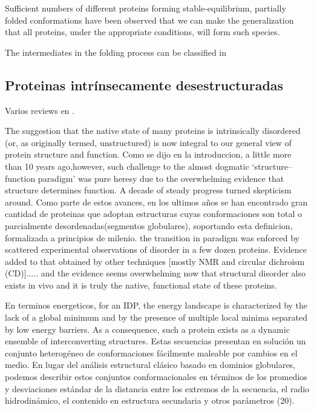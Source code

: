 Sufficient numbers of different proteins forming stable-equilibrium, partially folded conformations have been observed that we can
make the generalization that all proteins, under the appropriate conditions, will form such species.


The intermediates in the folding process can be classified in





\subsection{Proteinas intrínsecamente desestructuradas}

Varios reviews en \cite{uversky2010understanding,dyson2005intrinsically}.

The suggestion that the native state of many proteins is intrinsically disordered (or, as originally termed, unstructured) is now integral to our general view of protein structure and function.
Como se dijo en la introduccion, a little more than 10 years ago,however, such challenge to the almost dogmatic ‘structure–function paradigm’ was pure heresy due to the overwhelming evidence that structure determines function.
A decade of steady progress turned skepticism around.
Como parte de estos avances, en los ultimos años se han encontrado gran cantidad de proteinas que adoptan estructuras cuyas conformaciones son total o parcialmente desordenadas(segmentos globulares), soportando esta definicion, formalizada a principios de milenio. 
the transition in paradigm was enforced by scattered experimental observations of disorder in a few dozen proteins. 
Evidence added to that obtained by other techniques [mostly NMR and circular dichroism (CD)]..... and the evidence seems overwhelming now that structural disorder also exists in vivo and it is truly the native, functional state of these proteins.

En terminos energeticos, for an IDP, the energy landscape is characterized by the lack of a global minimum and by the presence of multiple local minima separated by low energy barriers. 
As a consequence, such a protein exists as a dynamic ensemble of interconverting structures.
Estas secuencias presentan en solución un conjunto heterogéneo de conformaciones fácilmente maleable por cambios en el medio. 
En lugar del análisis estructural clásico basado en dominios globulares, podemos describir estos conjuntos conformacionales en términos de los promedios y desviaciones estándar de la distancia entre los extremos de la secuencia, el radio hidrodinámico, el contenido en estructura secundaria y otros parámetros (20).

